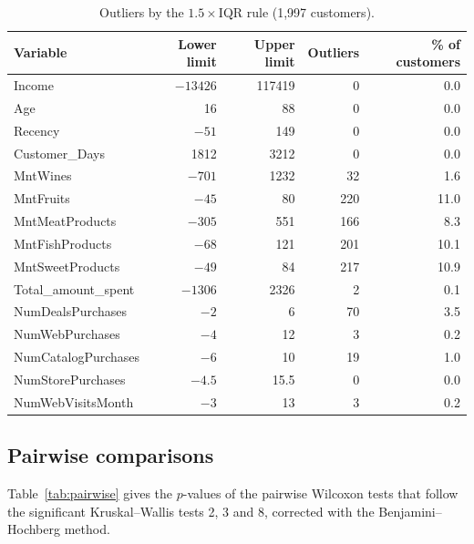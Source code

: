 \documentclass[11pt,a4paper]{article}
\begin{document}
\begin{table}[H]
	\centering
	\footnotesize
	\begin{tabular}{l r r r r}
		\toprule
		Variable              & Lower limit      & Upper limit      & Outliers & \% of customers \\
		\midrule
		Income                & $-\num{13426}$   & \num{117419}     & 0        & 0.0             \\
		Age                   & 16               & 88               & 0        & 0.0             \\
		Recency               & $-51$            & 149              & 0        & 0.0             \\
		Customer\_Days        & \num{1812}       & \num{3212}       & 0        & 0.0             \\
		MntWines              & $-701$           & \num{1232}       & 32       & 1.6             \\
		MntFruits             & $-45$            & 80               & 220      & 11.0            \\
		MntMeatProducts       & $-305$           & 551              & 166      & 8.3             \\
		MntFishProducts       & $-68$            & 121              & 201      & 10.1            \\
		MntSweetProducts      & $-49$            & 84               & 217      & 10.9            \\
		Total\_amount\_spent  & $-\num{1306}$    & \num{2326}       & 2        & 0.1             \\
		NumDealsPurchases     & $-2$             & 6                & 70       & 3.5             \\
		NumWebPurchases       & $-4$             & 12               & 3        & 0.2             \\
		NumCatalogPurchases   & $-6$             & 10               & 19       & 1.0             \\
		NumStorePurchases     & $-4.5$           & 15.5             & 0        & 0.0             \\
		NumWebVisitsMonth     & $-3$             & 13               & 3        & 0.2             \\
		\bottomrule
	\end{tabular}
	\caption{Outliers by the $1.5 \times \text{IQR}$ rule (1,997 customers).}
	\label{tab:outliers}
\end{table}

\subsection{Pairwise comparisons}
Table~\ref{tab:pairwise} gives the $p$-values of the pairwise Wilcoxon tests that follow the significant Kruskal--Wallis tests 2, 3 and 8, corrected with the Benjamini--Hochberg method.
\end{document}
